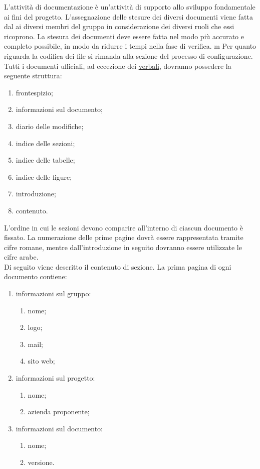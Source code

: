 	L'attività di documentazione è un'attività di supporto allo sviluppo fondamentale ai fini del progetto.
	L'assegnazione delle stesure dei diversi documenti viene fatta dal  ai diversi membri del gruppo in considerazione dei diversi ruoli che essi ricoprono.
	La stesura dei documenti deve essere fatta nel modo più accurato e completo possibile, in modo da ridurre i tempi nella fase di verifica.
			m
				Per quanto riguarda la codifica dei file si rimanda alla sezione  del processo di configurazione.
				Tutti i documenti ufficiali, ad eccezione dei \hyperref[sec:verbali]{verbali}, dovranno possedere la seguente struttura:
				\begin{enumerate}
					\item frontespizio;
					\item informazioni sul documento;
					\item diario delle modifiche;
					\item indice delle sezioni;
					\item indice delle tabelle;
					\item indice delle figure;
					\item introduzione;
					\item contenuto.
				\end{enumerate}
				L’ordine in cui le sezioni devono comparire all’interno di ciascun documento è fissato. La numerazione delle prime pagine dovrà essere rappresentata tramite cifre romane, mentre dall'introduzione in seguito dovranno essere utilizzate le cifre arabe. \\
				Di seguito viene descritto il contenuto di sezione.
					La prima pagina di ogni documento contiene:
					\begin{enumerate}
						\item informazioni sul gruppo:
						\begin{enumerate}
							\item nome;
							\item logo;
							\item mail;
							\item sito web;
						\end{enumerate}
						\item informazioni sul progetto:
						\begin{enumerate}
							\item nome;
							\item azienda proponente;
						\end{enumerate}
						\item informazioni sul documento:
						\begin{enumerate}
							\item nome;
							\item versione.
						\end{enumerate}
					\end{enumerate}
